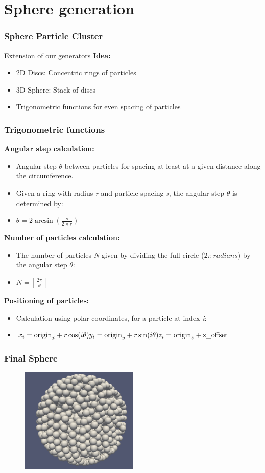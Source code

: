 
\section{Sphere generation}
\label{sec:sphere}

\begin{frame}
    \frametitle{Sphere Particle Cluster}
    Extension of our generators \newline
    \textbf{Idea:}
    \begin{itemize}
        \item 2D Discs: Concentric rings of particles
        \item 3D Sphere: Stack of discs
        \item Trigonometric functions for even spacing of particles
    \end{itemize}
\end{frame}

\begin{frame}
    \frametitle{Trigonometric functions}
    \textbf{Angular step calculation:}
    \begin{itemize}
        \item Angular step $\theta$ between particles for spacing at least at a given distance along the circumference.
        \item Given a ring with radius \textit{r} and particle spacing \textit{s}, the angular step $\theta$ is determined by:
        \item $\theta = 2 \arcsin\left(\frac{s}{2 \times r}\right)$
    \end{itemize}
    \textbf{Number of particles calculation:}
    \begin{itemize}
        \item The number of particles \textit{N} given by dividing the full circle ($2\pi\ radians$) by the angular step $\theta$:
        \item $N = \left\lfloor \frac{2\pi}{\theta} \right\rfloor$
    \end{itemize}
    \textbf{Positioning of particles:}
    \begin{itemize}
        \item Calculation using polar coordinates, for a particle at index \textit{i}:
        \item $x_i = \text{origin}_x + r \cos(i \theta)\newline y_i = \text{origin}_y + r \sin(i \theta)\newline z_i = \text{origin}_z + \text{z\_offset}$
    \end{itemize}
\end{frame}

\begin{frame}
    \frametitle{Final Sphere}
    \begin{figure}
        \label{fig:sphere}
        \includegraphics[width=0.5\textwidth]{../../res/sphere}
    \end{figure}
\end{frame}